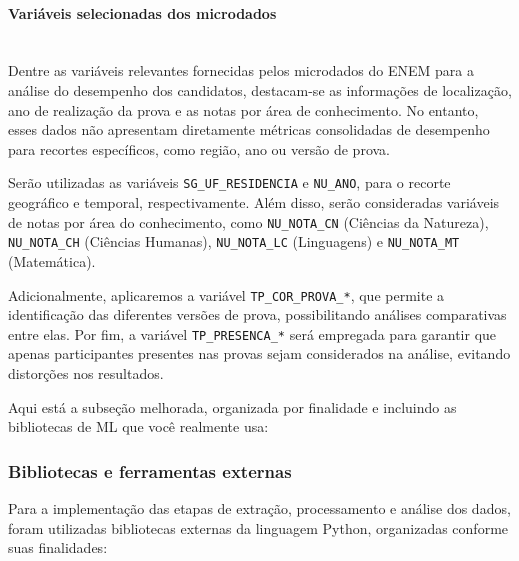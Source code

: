 \documentclass[a4paper,10pt, twocolumn]{article}
\begin{document}
\paragraph{Variáveis selecionadas dos microdados}
\mbox{}\\

Dentre as variáveis relevantes fornecidas pelos microdados do ENEM para a análise do desempenho dos candidatos, destacam-se as informações de localização, ano de realização da prova e as notas por área de conhecimento. No entanto, esses dados não apresentam diretamente métricas consolidadas de desempenho para recortes específicos, como região, ano ou versão de prova.

Serão utilizadas as variáveis  \texttt{SG\_UF\_RESIDENCIA} e \texttt{NU\_ANO}, para o recorte geográfico e temporal, respectivamente. Além disso, serão consideradas variáveis de notas por área do conhecimento, como  \texttt{NU\_NOTA\_CN} (Ciências da Natureza), \texttt{NU\_NOTA\_CH}  (Ciências Humanas), \texttt{NU\_NOTA\_LC} (Linguagens) e \texttt{NU\_NOTA\_MT} (Matemática).

Adicionalmente, aplicaremos a variável \texttt{TP\_COR\_PROVA\_*}, que permite a identificação das diferentes versões de prova, possibilitando análises comparativas entre elas. Por fim, a variável \texttt{TP\_PRESENCA\_*} será empregada para garantir que apenas participantes presentes nas provas sejam considerados na análise, evitando distorções nos resultados.

Aqui está a subseção melhorada, organizada por finalidade e incluindo as bibliotecas de ML que você realmente usa:

\subsubsection{Bibliotecas e ferramentas externas}

Para a implementação das etapas de extração, processamento e análise dos dados, foram utilizadas bibliotecas externas da linguagem Python, organizadas conforme suas finalidades:
\end{document}
